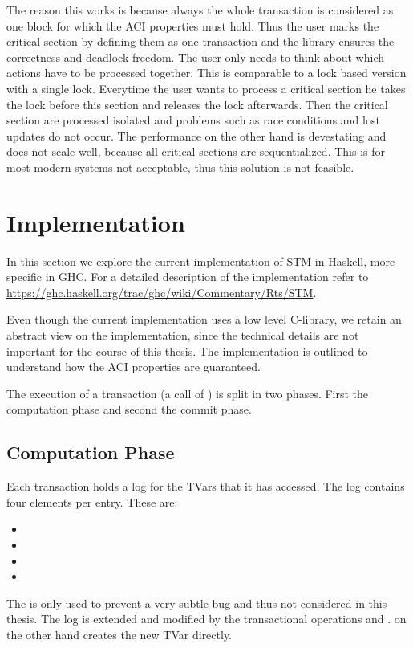 The reason this works is because always the whole transaction is considered as one block for which
the ACI properties must hold. Thus the user marks the critical section by defining them as one transaction and the 
library ensures the correctness and deadlock freedom. The user only needs to think about which actions have to be 
processed together. This is comparable to a lock based version with a single lock. Everytime the user wants to process a 
critical section he takes the lock before this section and releases the lock afterwards. Then the critical section 
are processed isolated and problems such as race conditions and lost updates do not occur. The performance on the
other hand is devestating and does not scale well, because all critical sections are sequentialized. This is for
most modern systems not acceptable, thus this solution is not feasible.
  
\section{Implementation}
\label{sec:GHCImpl}
In this section we explore the current implementation of STM in Haskell, more specific in GHC. For a detailed description of the implementation 
refer to \url{https://ghc.haskell.org/trac/ghc/wiki/Commentary/Rts/STM}. 

Even though the current implementation uses a low level C-library, we retain an abstract view on the implementation, since the technical 
details are not important for the course of this thesis. The implementation is outlined to understand how the ACI 
properties are guaranteed.

The execution of a transaction (a call of ) is split in two phases. First the computation phase and second the commit phase. 
 
\subsection{Computation Phase}
Each transaction holds a log for the TVars that it has accessed. The log contains four elements per entry. These are: 
\begin{itemize}
 \item {}
 \item {}
 \item {}
 \item {}
\end{itemize}
The  is only used to prevent a very subtle bug and thus not considered in this thesis. 
The log is extended and modified by the transactional operations  and .  on 
the other hand creates the new TVar directly. 

